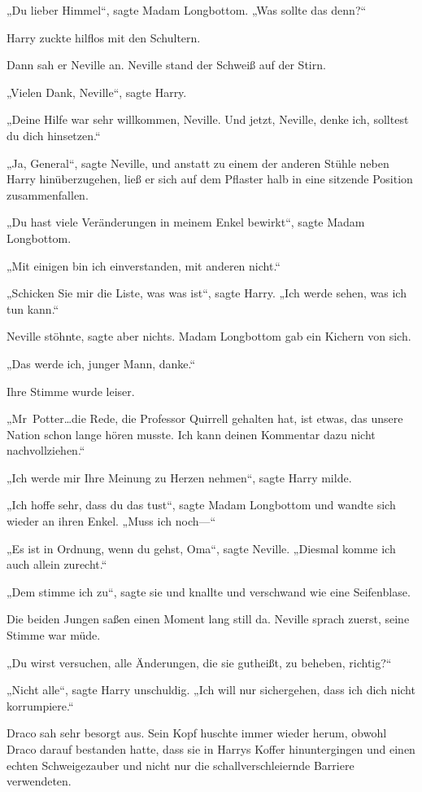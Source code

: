 {„Du lieber Himmel“, sagte Madam Longbottom. „Was sollte das denn?“

Harry zuckte hilflos mit den Schultern.

Dann sah er Neville an. Neville stand der Schweiß auf der Stirn.

„Vielen Dank, Neville“, sagte Harry.

„Deine Hilfe war sehr willkommen, Neville. Und jetzt, Neville, denke ich, solltest du dich hinsetzen.“

„Ja, General“, sagte Neville, und anstatt zu einem der anderen Stühle neben Harry hinüberzugehen, ließ er sich auf dem Pflaster halb in eine sitzende Position zusammenfallen.

„Du hast viele Veränderungen in meinem Enkel bewirkt“, sagte Madam Longbottom.

„Mit einigen bin ich einverstanden, mit anderen nicht.“

„Schicken Sie mir die Liste, was was ist“, sagte Harry. „Ich werde sehen, was ich tun kann.“

Neville stöhnte, sagte aber nichts. Madam Longbottom gab ein Kichern von sich.

„Das werde ich, junger Mann, danke.“

Ihre Stimme wurde leiser.

„Mr~Potter…die Rede, die Professor Quirrell gehalten hat, ist etwas, das unsere Nation schon lange hören musste. Ich kann deinen Kommentar dazu nicht nachvollziehen.“

„Ich werde mir Ihre Meinung zu Herzen nehmen“, sagte Harry milde.

„Ich hoffe sehr, dass du das tust“, sagte Madam Longbottom und wandte sich wieder an ihren Enkel. „Muss ich noch—“

„Es ist in Ordnung, wenn du gehst, Oma“, sagte Neville. „Diesmal komme ich auch allein zurecht.“

„Dem stimme ich zu“, sagte sie und knallte und verschwand wie eine Seifenblase.

Die beiden Jungen saßen einen Moment lang still da. Neville sprach zuerst, seine Stimme war müde.

„Du wirst versuchen, alle Änderungen, die sie gutheißt, zu beheben, richtig?“

„Nicht alle“, sagte Harry unschuldig. „Ich will nur sichergehen, dass ich dich nicht korrumpiere.“

Draco sah sehr besorgt aus. Sein Kopf huschte immer wieder herum, obwohl Draco darauf bestanden hatte, dass sie in Harrys Koffer hinuntergingen und einen echten Schweigezauber und nicht nur die schallverschleiernde Barriere verwendeten.

}
